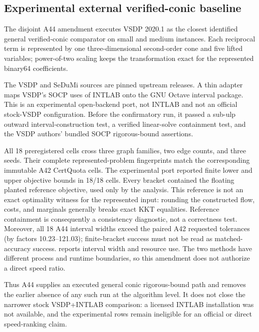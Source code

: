 \documentclass[smallextended,envcountsect]{svjour3}
\begin{document}
\subsection{Experimental external verified-conic baseline}
\label{sec:results-a44}

The disjoint A44 amendment executes VSDP 2020.1 as the closest identified
general verified-conic comparator on small and medium instances.
Each reciprocal term is represented by one three-dimensional
second-order cone and five lifted variables; power-of-two scaling keeps the
transformation exact for the represented binary64 coefficients.

The VSDP and SeDuMi sources are pinned upstream releases.  A thin adapter maps
VSDP's SOCP uses of INTLAB onto the GNU Octave interval package.  This is an
experimental open-backend port, not INTLAB and not an official stock-VSDP
configuration.  Before the confirmatory run, it passed a sub-ulp outward
interval-construction test, a verified linear-solve containment test, and the
VSDP authors' bundled SOCP rigorous-bound assertions.

All 18 preregistered cells cross three graph families, two edge counts, and
three seeds. Their complete represented-problem fingerprints match the
corresponding immutable A42 CertQuota cells. The experimental port reported
finite lower and upper objective bounds in 18/18 cells. Every bracket
contained the floating planted reference objective, used only by the analysis.
This reference is not an exact optimality witness for the represented input:
rounding the constructed flow, costs, and marginals generally breaks exact
KKT equalities. Reference containment is consequently a consistency diagnostic,
not a correctness test. Moreover, all 18 A44 interval widths exceed the paired
A42 requested tolerances (by factors 10.23--121.03); finite-bracket success
must not be read as matched-accuracy success.
 reports interval width and resource use.  The two
methods have different process and runtime boundaries, so this amendment
does not authorize a direct speed ratio.



Thus A44 supplies an executed general conic rigorous-bound path and removes
the earlier absence of any such run at the algorithm level.  It does not close
the narrower stock VSDP+INTLAB comparison: a licensed INTLAB installation was
not available, and the experimental rows remain ineligible for an official or
direct speed-ranking claim.
\end{document}
